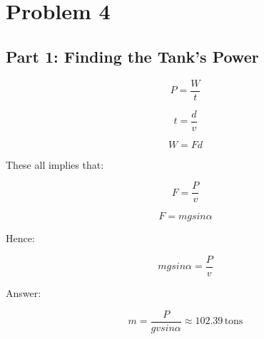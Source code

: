 \section{Problem 4}


\subsection*{Part 1: Finding the Tank's Power}

\[P = \frac{W}{t}\]

\[t = \frac{d}{v}\]

\[W = Fd\]

These all implies that:

\[F = \frac{P}{v}\]

\[F = mgsin\alpha\]

Hence:

\[mgsin\alpha = \frac{P}{v}\]

Answer:

\[m = \frac{P}{gvsin\alpha} \approx \boxed{102.39 \, \text{tons}}\]
